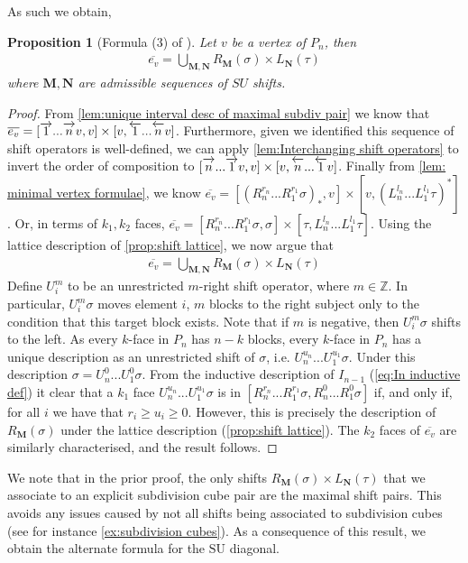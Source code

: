 \documentclass{amsart}
\newtheorem{proposition}[theorem]{Proposition}
\theoremstyle{definition}
\newcommand{\SU}{\mathrm{SU}}
\newcommand{\rightshift}[1]{\overrightarrow{\vphantom{1}{#1}}}
\newcommand{\leftshift}[1]{\overleftarrow{\vphantom{1}{#1}}}
\newcommand{\maxsubdivpairsv}{\overline{e_v}}
\begin{document}
As such we obtain,
\begin{proposition}[Formula (3) of \cite{saneblidzeComparingDiagonalsAssociahedra2022}]
Let $v$ be a vertex of $P_n$, then
\begin{align*}
    \maxsubdivpairsv = \bigcup_{\mathbf{M},\mathbf{N}} R_\mathbf{M}(\sigma) \times L_{\mathbf{N}}(\tau)
\end{align*}
where $\mathbf{M},\mathbf{N}$ are admissible sequences of $SU$ shifts.
\end{proposition}
\begin{proof}
From \cref{lem:unique interval desc of maximal subdiv pair} we know that $\maxsubdivpairsv = [\rightshift{1}...\rightshift{n}v, v] \times [v, \leftshift{1}...\leftshift{n}v]$. Furthermore, given we identified this sequence of shift operators is well-defined, we can apply \cref{lem:Interchanging shift operators} to invert the order of composition to $[\rightshift{n}...\rightshift{1}v, v] \times [v, \leftshift{n}...\leftshift{1}v]$.
Finally from \cref{lem: minimal vertex formulae}, we know $\maxsubdivpairsv =[(R^{r_n}_{n}...R^{r_{1}}_{1}\sigma)_*,v] \times [v,(L^{l_n}_{n}...L^{l_{1}}_{1}\tau)^*]$.
Or, in terms of $k_1,k_2$ faces,
$\maxsubdivpairsv = [R^{r_n}_{n}...R^{r_{1}}_{1}\sigma,\sigma] \times [\tau, L^{l_n}_{n}...L^{l_{1}}_{1}\tau]$.
Using the lattice description of \cref{prop:shift lattice}, we now argue that 
\begin{align*}
    \maxsubdivpairsv = \bigcup_{\mathbf{M},\mathbf{N}} R_\mathbf{M}(\sigma) \times L_{\mathbf{N}}(\tau)
\end{align*}
Define $U^{m}_i$ to be an unrestricted $m$-right shift operator, where $m \in \mathbb{Z}$.
In particular, $U^{m}_i \sigma$ moves element $i$, $m$ blocks to the right subject only to the condition that this target block exists.
Note that if $m$ is negative, then $U^{m}_i \sigma$ shifts to the left.
As every $k$-face in $P_n$ has $n-k$ blocks, every $k$-face in $P_n$ has a unique description as an unrestricted shift of $\sigma$, i.e. $U^{u_n}_{n}...U^{u_{1}}_{1}\sigma$.
Under this description $\sigma = {U}^{0}_{n}...{U}^{0}_{1}\sigma$.
From the inductive description of $I_{n-1}$ (\cref{eq:In inductive def}) it clear that a $k_1$ face $U^{u_n}_{n}...U^{u_{1}}_{1}\sigma$ is in $[R^{r_n}_{n}...R^{r_{1}}_{1}\sigma,R^{0}_{n}...R^{0}_{1}\sigma]$ if, and only if, for all $i$ we have that $r_{i}\geq u_i \geq 0$.
However, this is precisely the description of $R_\mathbf{M}(\sigma)$ under the lattice description (\cref{prop:shift lattice}).
The $k_2$ faces of $\maxsubdivpairsv$ are similarly characterised, and the result follows.
\end{proof}
We note that in the prior proof, the only shifts $R_\mathbf{M}(\sigma) \times L_{\mathbf{N}}(\tau)$ that we associate to an explicit subdivision cube pair are the maximal shift pairs.
This avoids any issues caused by not all shifts being associated to subdivision cubes (see for instance \cref{ex:subdivision cubes}).
As a consequence of this result, we obtain the alternate formula for the $\SU$ diagonal.
\end{document}
